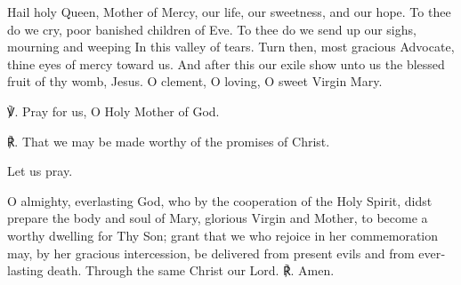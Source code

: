 \begin{otherlanguage}{english}Hail holy Queen, Mother of Mercy, 
our life, our sweetness, and our hope. 
To thee do we cry, poor banished children of Eve. 
To thee do we send up our sighs, mourning and weeping 
In this valley of tears. Turn then, most gracious Advocate, 
thine eyes of mercy toward us. 
And after this our exile show unto us 
the blessed fruit of thy womb, Jesus.
O clement, O loving, O sweet Virgin Mary.

℣. Pray for us, O Holy Mother of God.

℟. That we may be made worthy of the promises of Christ.

Let us pray.

O almighty, everlasting God, who by the cooperation of the Holy Spirit, didst prepare the body and soul of Mary, glorious Virgin and Mother, to become a worthy dwelling for Thy Son; grant that we who rejoice in her commemoration may, by her gracious intercession, be delivered from present evils and from everlasting death. Through the same Christ our Lord. ℟. Amen.
\end{otherlanguage}
